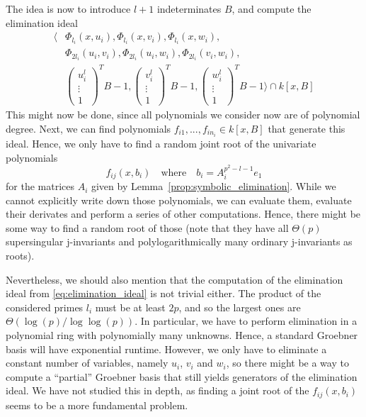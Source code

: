 The idea is now to introduce $l + 1$ indeterminates $B$, and compute the elimination ideal
\begin{equation}
\label{eq:elimination_ideal}
\begin{split}
    \langle &\Phi_{l_i}(x, u_i), \Phi_{l_i}(x, v_i), \Phi_{l_i}(x, w_i), \\
    &\Phi_{2l_i}(u_i, v_i), \Phi_{2l_i}(u_i, w_i), \Phi_{2l_i}(v_i, w_i), \\
    &\left(\begin{matrix*}
        u_i^l \\
        \vdots \\
        1
    \end{matrix*}\right)^T B - 1, \left(\begin{matrix*}
        v_i^l \\
        \vdots \\
        1
    \end{matrix*}\right)^T B - 1, \left(\begin{matrix*}
        w_i^l \\
        \vdots \\
        1
    \end{matrix*}\right)^T B - 1 \rangle \cap k[x, B]
\end{split}
\end{equation}
This might now be done, since all polynomials we consider now are of polynomial degree.
Next, we can find polynomials $f_{i1}, ..., f_{in_i} \in k[x, B]$ that generate this ideal.
Hence, we only have to find a random joint root of the univariate polynomials
\begin{equation*}
    f_{i j}(x, b_i) \quad \text{where} \quad b_i = A_i^{p^2 - l - 1} e_1
\end{equation*}
for the matrices $A_i$ given by Lemma~\ref{prop:symbolic_elimination}.
While we cannot explicitly write down those polynomials, we can evaluate them, evaluate their derivates and perform a series of other computations.
Hence, there might be some way to find a random root of those (note that they have all $\Theta(p)$ supersingular j-invariants and polylogarithmically many ordinary j-invariants as roots).

Nevertheless, we should also mention that the computation of the elimination ideal from \ref{eq:elimination_ideal} is not trivial either.
The product of the considered primes $l_i$ must be at least $2p$, and so the largest ones are $\Theta(\log(p)/\log\log(p))$.
In particular, we have to perform elimination in a polynomial ring with polynomially many unknowns.
Hence, a standard Groebner basis will have exponential runtime.
However, we only have to eliminate a constant number of variables, namely $u_i$, $v_i$ and $w_i$, so there might be a way to compute a ``partial'' Groebner basis that still yields generators of the elimination ideal.
We have not studied this in depth, as finding a joint root of the $f_{ij}(x, b_i)$ seems to be a more fundamental problem.
